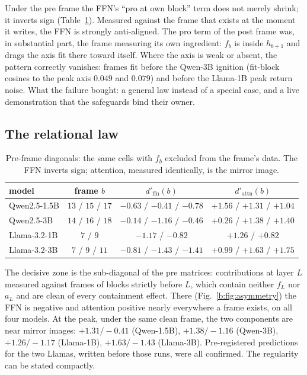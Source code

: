 \documentclass[11pt]{article}
\begin{document}
Under the pre frame the FFN's ``pro at own block'' term does not merely
shrink; it inverts sign (Table~\ref{b:tab:pre}). Measured against the frame
that exists at the moment it writes, the FFN is strongly anti-aligned. The
pro term of the post frame was, in substantial part, the frame measuring
its own ingredient: $f_b$ is inside $h_{b+1}$ and drags the axis fit there
toward itself. Where the axis is weak or absent, the pattern correctly
vanishes: frames fit before the Qwen-3B ignition (fit-block cosines to the
peak axis $0.049$ and $0.079$) and before the Llama-1B peak return noise.
What the failure bought: a general law instead of a special case, and a
live demonstration that the safeguards bind their owner.

\subsection{The relational law}
\label{b:sec:law}

\begin{table}[H]
\centering
\caption{Pre-frame diagonals: the same cells with $f_b$ excluded from the
frame's data. The FFN inverts sign; attention, measured identically, is the
mirror image.}
\label{b:tab:pre}
\begin{tabular}{lccc}
\toprule
model & frame $b$ & $d'_{\mathrm{ffn}}(b)$ & $d'_{\mathrm{attn}}(b)$ \\
\midrule
Qwen2.5-1.5B & $13$ / $15$ / $17$ & $-0.63$ / $-0.41$ / $-0.78$ & $+1.56$ / $+1.31$ / $+1.04$ \\
Qwen2.5-3B   & $14$ / $16$ / $18$ & $-0.14$ / $-1.16$ / $-0.46$ & $+0.26$ / $+1.38$ / $+1.40$ \\
Llama-3.2-1B & $7$ / $9$          & $-1.17$ / $-0.82$           & $+1.26$ / $+0.82$ \\
Llama-3.2-3B & $7$ / $9$ / $11$   & $-0.81$ / $-1.43$ / $-1.41$ & $+0.99$ / $+1.63$ / $+1.75$ \\
\bottomrule
\end{tabular}
\end{table}

The decisive zone is the sub-diagonal of the pre matrices: contributions at
layer $L$ measured against frames of blocks strictly before $L$, which
contain neither $f_L$ nor $a_L$ and are clean of every containment effect.
There (Fig.~\ref{b:fig:asymmetry}) the FFN is negative and attention positive
nearly everywhere a frame exists, on all four models. At the peak, under
the same clean frame, the two components are near mirror images:
$+1.31/-0.41$ (Qwen-1.5B), $+1.38/-1.16$ (Qwen-3B), $+1.26/-1.17$
(Llama-1B), $+1.63/-1.43$ (Llama-3B). Pre-registered predictions for the
two Llamas, written before those runs, were all confirmed. The regularity
can be stated compactly.
\end{document}
